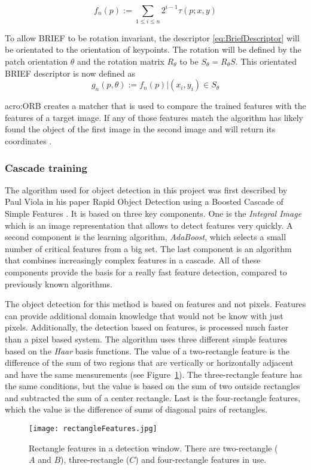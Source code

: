 \begin{equation}\label{eq:BinaryFeature} f_{n}(p) := \sum_{1 \leq i \leq n}2^{i-1} \tau(p;x,y)\end{equation}

To allow BRIEF to be rotation invariant, the descriptor \eqref{eq:BriefDescriptor} will be orientated to the orientation of keypoints. The rotation will be defined by the patch orientation $\theta$ and the rotation matrix $R_{\theta}$ to be $S_{\theta} = R_{\theta}S$.
This orientated BRIEF descriptor is now defined as
\begin{equation}\label{eq:BriefDescriptor} g_{n}(p,\theta) := f_{n}(p)|(x_{i},y_{i}) \in S_{\theta}\end{equation}

\acrshort{acro:ORB} creates a matcher that is used to compare the trained features with the features of a target image. If any of those features match the algorithm has likely found the object of the first image in the second image and will return its coordinates \citep{rublee_rabaud_konolige_bradski_2011}.

\subsubsection{Cascade training}
\label{sub:CascadeTraining}
The algorithm used for object detection in this project was first described by Paul Viola in his paper Rapid Object Detection using a Boosted Cascade of Simple Features \citep{viola_jones_2001}. It is based on three key components. One is the \textit{Integral Image} which is an image representation that allows to detect features very quickly. A second component is the learning algorithm, \textit{AdaBoost}, which selects a small number of critical features from a big set. The last component is an algorithm that combines increasingly complex features in a cascade. All of these components provide the basis for a really fast feature detection, compared to previously known algorithms.

The object detection for this method is based on features and not pixels. Features can provide additional domain knowledge that would not be know with just pixels. Additionally, the detection based on features, is processed much faster than a pixel based system. The algorithm uses three different simple features based on the \textit{Haar} basis functions. The value of a two-rectangle feature is the difference of the sum of two regions that are vertically or horizontally adjacent and have the same measurements (see Figure~\ref{fig:rectFeat}). The three-rectangle feature has the same conditions, but the value is based on the sum of two outside rectangles and subtracted the sum of a center rectangle. Last is the four-rectangle features, which the value is the difference of sums of diagonal pairs of rectangles.
\begin{figure}[H]
	\centering
	\texttt{[image: rectangleFeatures.jpg]}
	\caption{Rectangle features in a detection window. There are two-rectangle ($A$ and $B$), three-rectangle ($C$) and four-rectangle features in use.}
	\label{fig:rectFeat}
\end{figure}

